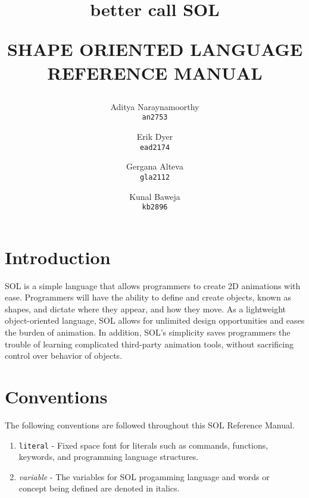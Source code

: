\documentclass[letterpaper,12pt]{article}
\begin{document}

\title{{\small better call} {\Huge \textbf{SOL}}\\
    \begin{center}{SHAPE ORIENTED LANGUAGE REFERENCE MANUAL}\end{center}
}


\author{Aditya Naraynamoorthy\\
    \texttt{an2753}
    \and
    Erik Dyer\\
    \texttt{ead2174}
    \and
    Gergana Alteva\\
    \texttt{gla2112}
    \and
    Kunal Baweja\\
    \texttt{kb2896}}

\maketitle

\tableofcontents

\section{Introduction}
SOL is a simple language that allows programmers to create 2D animations with ease. Programmers will have the ability to define and create objects, known as shapes, and dictate where they appear, and how they move. As a lightweight object-oriented language, SOL allows for unlimited design opportunities and eases the burden of animation. In addition, SOL’s simplicity saves programmers the trouble of learning complicated third-party animation tools, without sacrificing control over behavior of objects.
\par

\section{Conventions}
The following conventions are followed throughout this SOL Reference Manual.

    \begin{enumerate}
        \itemsep0em
        \item \texttt{literal} - Fixed space font for literals such as commands, functions,\\
        \hspace*{4.4em} keywords, and programming language structures.
        
        \item \textit{variable} - The variables for SOL progamming language and words or\\
        \hspace*{4.4em} concept being defined are denoted in italics.
    \end{enumerate}
\end{document}
